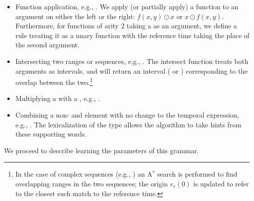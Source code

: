 \begin{itemize}
	\item Function application, e.g., .
		We apply (or partially apply) a function to an argument
			on either the left or the right: $f(x,y) \odot x$ or $x \odot f(x,y)$.
		Furthermore, for functions of arity 2 taking a  as an argument,
			we define a rule treating it as a unary function with the reference time
			taking the place of the second argument.
	\item Intersecting two ranges or sequences, e.g., .
		The intersect function treats both arguments as intervals, and will return
			an interval ( or ) corresponding to the overlap
			between the two.\footnote{
				In the case of complex sequences 
					(e.g., ) an A$^{*}$
					search is performed to find overlapping ranges in the two sequences;
					the origin $r_s(0)$ is updated to refer to the closest such
					match to the reference time.
			}
	\item Multiplying a  with a , e.g., .
	\item Combining a non- and  element with no change to the
			temporal expression, e.g., .
		The lexicalization of the  type allows the algorithm
			to take hints from these supporting words.
\end{itemize}

We proceed to describe learning the parameters of this grammar.

